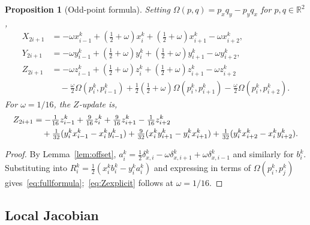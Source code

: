 \documentclass{article}
\theoremstyle{plain}
\newtheorem{proposition}[theorem]{Proposition}
\theoremstyle{definition}
\newcommand{\R}{\mathbb{R}}
\begin{document}
\begin{proposition}[Odd-point formula]\label{prop:formula}
Setting $\Omega(p,q)=p_xq_y-p_yq_x$ for $p,q\in\R^2$,
\begin{equation}\label{eq:fullformula}
\boxed{
\begin{aligned}
X_{2i+1}&={-}\omega x_{i-1}^k+(\tfrac{1}{2}{+}\omega)x_i^k
  +(\tfrac{1}{2}{+}\omega)x_{i+1}^k-\omega x_{i+2}^k,\\[2pt]
Y_{2i+1}&={-}\omega y_{i-1}^k+(\tfrac{1}{2}{+}\omega)y_i^k
  +(\tfrac{1}{2}{+}\omega)y_{i+1}^k-\omega y_{i+2}^k,\\[2pt]
Z_{2i+1}&={-}\omega z_{i-1}^k+(\tfrac{1}{2}{+}\omega)z_i^k
  +(\tfrac{1}{2}{+}\omega)z_{i+1}^k-\omega z_{i+2}^k\\
&\quad -\tfrac{\omega}{2}\Omega(p_i^k,p_{i-1}^k)
  +\tfrac{1}{2}(\tfrac{1}{2}{+}\omega)\Omega(p_i^k,p_{i+1}^k)
  -\tfrac{\omega}{2}\Omega(p_i^k,p_{i+2}^k).
\end{aligned}
}
\end{equation}
For $\omega=1/16$, the $Z$-update is,
\begin{align}\label{eq:Zexplicit}
Z_{2i+1}&=-\tfrac{1}{16}z_{i-1}^k+\tfrac{9}{16}z_i^k+\tfrac{9}{16}z_{i+1}^k
  -\tfrac{1}{16}z_{i+2}^k\notag\\
&\quad+\tfrac{1}{32}(y_i^k x_{i-1}^k-x_i^k y_{i-1}^k)
  +\tfrac{9}{32}(x_i^k y_{i+1}^k-y_i^k x_{i+1}^k)
  +\tfrac{1}{32}(y_i^k x_{i+2}^k-x_i^k y_{i+2}^k).
\end{align}
\end{proposition}

\begin{proof}
By Lemma~\ref{lem:offset},
$a_i^k=\tfrac{1}{2}\delta_{x,i}^k-\omega\delta_{x,i+1}^k+\omega\delta_{x,i-1}^k$
and similarly for $b_i^k$. Substituting into
$R_i^k=\tfrac{1}{2}(x_i^k b_i^k-y_i^k a_i^k)$ and expressing in terms of
$\Omega(p_i^k,p_j^k)$ gives~\eqref{eq:fullformula};~\eqref{eq:Zexplicit}
follows at $\omega=1/16$.
\end{proof}

\subsection{Local Jacobian}
\end{document}
